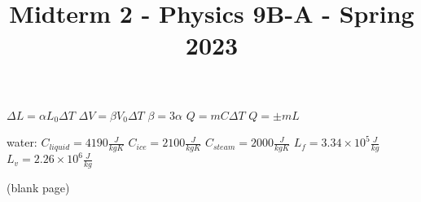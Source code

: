 \documentclass{exam}
\begin{document}
$\Delta L = \alpha L_0 \Delta T$
$\Delta V = \beta V_0 \Delta T$
$\beta=3\alpha$
$Q=m C \Delta T$
$Q=\pm mL$


water: $C_{liquid}=4190\frac{J}{kgK}$
$C_{ice}=2100\frac{J}{kgK}$
$C_{steam}=2000\frac{J}{kgK}$
$L_f=3.34\times10^5 \frac{J}{kg}$
$L_v=2.26\times10^6 \frac{J}{kg}$

\newpage
\centering(blank page)
\newpage




\title{Midterm 2 - Physics 9B-A - Spring 2023}
\author{}
\date{}
\maketitle





\vspace{20mm}

\vspace{10mm}
\newpage
\end{document}
